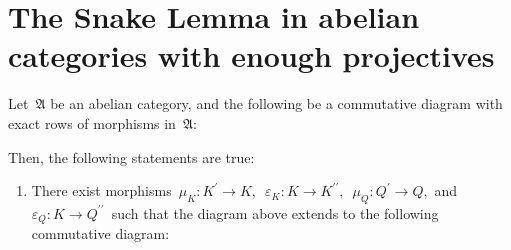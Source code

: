 

\section{The Snake Lemma in abelian categories with enough projectives}
\setcounter{theorem}{0}
\setcounter{equation}{0}


\renewcommand{\theenumi}{\roman{enumi}}
\renewcommand{\labelenumi}{\textnormal{(\theenumi)}$\;\;$}


\begin{theorem}
\mbox{}
\vskip 0.15cm
\noindent
Let \,$\mathfrak{A}$ be an abelian category, and
the following be a commutative diagram with exact rows of morphisms in \,$\mathfrak{A}$:
\begin{center}
\end{center}
Then, the following statements are true:
\begin{enumerate}
\item
	There exist morphisms
	\,$\mu_{K} : K^{\prime} \longrightarrow K$,\,
	\,$\varepsilon_{K} : K \longrightarrow K^{\prime\prime}$,\,
	\,$\mu_{Q} : Q^{\prime} \longrightarrow Q$,\,
	and
	\,$\varepsilon_{Q} : K \longrightarrow Q^{\prime\prime}$\,
	such that the diagram above extends to the following commutative diagram:
	\begin{center}
\end{center}
\end{enumerate}
\end{theorem}
